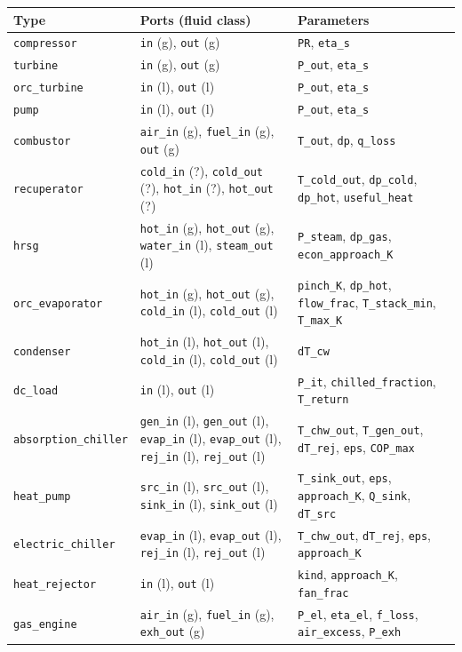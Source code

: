 \begingroup\scriptsize\setlength{\tabcolsep}{4pt}\renewcommand{\arraystretch}{1.15}
\begin{tabular}{@{}p{3.2cm}p{4.9cm}p{7.0cm}@{}}
\toprule
Type & Ports (fluid class) & Parameters \\
\midrule
\texttt{compressor} & \texttt{in} (g), \texttt{out} (g) & \texttt{PR}, \texttt{eta\_s} \\
\texttt{turbine} & \texttt{in} (g), \texttt{out} (g) & \texttt{P\_out}, \texttt{eta\_s} \\
\texttt{orc\_turbine} & \texttt{in} (l), \texttt{out} (l) & \texttt{P\_out}, \texttt{eta\_s} \\
\texttt{pump} & \texttt{in} (l), \texttt{out} (l) & \texttt{P\_out}, \texttt{eta\_s} \\
\texttt{combustor} & \texttt{air\_in} (g), \texttt{fuel\_in} (g), \texttt{out} (g) & \texttt{T\_out}, \texttt{dp}, \texttt{q\_loss} \\
\texttt{recuperator} & \texttt{cold\_in} (?), \texttt{cold\_out} (?), \texttt{hot\_in} (?), \texttt{hot\_out} (?) & \texttt{T\_cold\_out}, \texttt{dp\_cold}, \texttt{dp\_hot}, \texttt{useful\_heat} \\
\texttt{hrsg} & \texttt{hot\_in} (g), \texttt{hot\_out} (g), \texttt{water\_in} (l), \texttt{steam\_out} (l) & \texttt{P\_steam}, \texttt{dp\_gas}, \texttt{econ\_approach\_K} \\
\texttt{orc\_evaporator} & \texttt{hot\_in} (g), \texttt{hot\_out} (g), \texttt{cold\_in} (l), \texttt{cold\_out} (l) & \texttt{pinch\_K}, \texttt{dp\_hot}, \texttt{flow\_frac}, \texttt{T\_stack\_min}, \texttt{T\_max\_K} \\
\texttt{condenser} & \texttt{hot\_in} (l), \texttt{hot\_out} (l), \texttt{cold\_in} (l), \texttt{cold\_out} (l) & \texttt{dT\_cw} \\
\texttt{dc\_load} & \texttt{in} (l), \texttt{out} (l) & \texttt{P\_it}, \texttt{chilled\_fraction}, \texttt{T\_return} \\
\texttt{absorption\_chiller} & \texttt{gen\_in} (l), \texttt{gen\_out} (l), \texttt{evap\_in} (l), \texttt{evap\_out} (l), \texttt{rej\_in} (l), \texttt{rej\_out} (l) & \texttt{T\_chw\_out}, \texttt{T\_gen\_out}, \texttt{dT\_rej}, \texttt{eps}, \texttt{COP\_max} \\
\texttt{heat\_pump} & \texttt{src\_in} (l), \texttt{src\_out} (l), \texttt{sink\_in} (l), \texttt{sink\_out} (l) & \texttt{T\_sink\_out}, \texttt{eps}, \texttt{approach\_K}, \texttt{Q\_sink}, \texttt{dT\_src} \\
\texttt{electric\_chiller} & \texttt{evap\_in} (l), \texttt{evap\_out} (l), \texttt{rej\_in} (l), \texttt{rej\_out} (l) & \texttt{T\_chw\_out}, \texttt{dT\_rej}, \texttt{eps}, \texttt{approach\_K} \\
\texttt{heat\_rejector} & \texttt{in} (l), \texttt{out} (l) & \texttt{kind}, \texttt{approach\_K}, \texttt{fan\_frac} \\
\texttt{gas\_engine} & \texttt{air\_in} (g), \texttt{fuel\_in} (g), \texttt{exh\_out} (g) & \texttt{P\_el}, \texttt{eta\_el}, \texttt{f\_loss}, \texttt{air\_excess}, \texttt{P\_exh} \\
\bottomrule
\end{tabular}\endgroup

